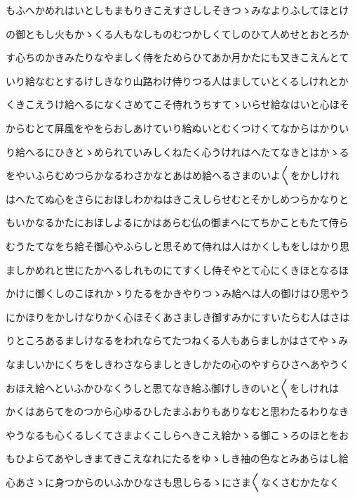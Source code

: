 \documentclass[a4paper,11pt,landscape]{ltjtarticle}
\begin{document}
\par\medskip
もふへかめれはいとしもまもりきこえすさししそきつゝみなよりふしてほとけ
\par\medskip
の御ともし火もかゝくる人もなしものむつかしくてしのひて人めせとおとろか
\par\medskip
す心ちのかきみたりなやましく侍をためらひてあか月かたにも又きこえんとて
\par\medskip
いり給なむとするけしきなり山路わけ侍りつる人はましていとくるしけれとか
\par\medskip
くきこえうけ給へるになくさめてこそ侍れうちすてゝいらせ給なはいと心ほそ
\par\medskip
からむとて屏風をやをらおしあけていり給ぬいとむくつけくてなからはかりい
\par\medskip
り給へるにひきとゝめられていみしくねたく心うけれはへたてなきとはかゝる
\par\medskip
をやいふらむめつらかなるわさかなとあはめ給へるさまのいよ〱をかしけれ
\par\medskip
はへたてぬ心をさらにおほしわかねはきこえしらせむとそかしめつらかなりと
\par\medskip
もいかなるかたにおほしよるにかはあらむ仏の御まへにてちかこともたて侍ら
\par\medskip
むうたてなをち給そ御心やふらしと思そめて侍れは人はかくしもをしはかり思
\par\medskip
ましかめれと世にたかへるしれものにてすくし侍そやとて心にくきほとなるほ
\par\medskip
かけに御くしのこほれかゝりたるをかきやりつゝみ給へは人の御けはひ思やう
\par\medskip
にかほりをかしけなりかく心ほそくあさましき御すみかにすいたらむ人はさは
\par\medskip
りところあるましけなるをわれならてたつねくる人もあらましかはさてやゝみ
\par\medskip
なましいかにくちをしきわさならましときしかたの心のやすらひさへあやうく
\par\medskip
おほえ給へといふかひなくうしと思てなき給ふ御けしきのいと〱をしけれは
\par\medskip
かくはあらてをのつから心ゆるひしたまふおりもありなむと思わたるわりなき
\par\medskip
やうなるも心くるしくてさまよくこしらへきこえ給かゝる御こゝろのほとをお
\par\medskip
もひよらてあやしきまてきこえなれにたるをゆゝしき袖の色なとみあらはし給
\par\medskip
心あさゝに身つからのいふかひなさも思しらるゝにさま〱なくさむかたなく
\par\medskip
\end{document}
